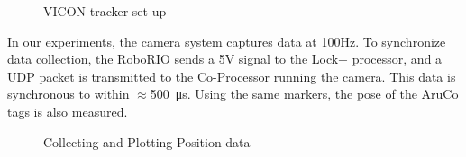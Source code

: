 \documentclass{article}
\begin{document}
    \begin{figure}[H]%
        \centering
        \qquad
        \caption{VICON tracker set up}%
        \label{fig:viconSetup}%
    \end{figure}

    In our experiments, the camera system captures data at 100Hz. To synchronize data collection, the RoboRIO sends a 5V signal to the Lock+ processor, and a UDP packet is transmitted to the Co-Processor running the camera. This data is synchronous to within $\approx$\SI{500}{\micro\second}. Using the same markers, the pose of the AruCo tags is also measured.

    \begin{figure}[H]%
      \centering
      \qquad
      \caption{Collecting and Plotting Position data}%
      \label{fig:positionData}%
    \end{figure}
\end{document}
